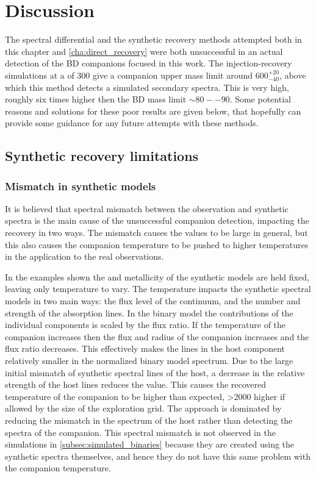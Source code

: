 
\section{Discussion}
\label{sec:chisquared_discussion}
The spectral differential and the synthetic recovery methods attempted both in this chapter and \cref{cha:direct_recovery} were both unsuccessful in an actual detection of the {BD} companions focused in this work.
The injection-recovery simulations at a \snr{} of 300 give a companion upper mass limit around \(600^{+20}_{-40}\), above which this method detects a simulated secondary spectra.
This is very high, roughly six times higher then the {BD} mass limit \(\sim80--90\)\Mjup{}.
Some potential reasons and solutions for these poor results are given below, that hopefully can provide some guidance for any future attempts with these methods.

\subsection{Synthetic recovery limitations}
\label{subsec:limitations}

\subsubsection{Mismatch in synthetic models}
\label{subsubsec:mismatch}
It is believed that spectral mismatch between the observation and synthetic spectra is the main cause of the unsuccessful companion detection, impacting the recovery in two ways.
The mismatch causes the \textchisquared{} values to be large in general, but this also causes the companion temperature to be pushed to higher temperatures in the application to the real observations.

In the examples shown the \Logg{} and metallicity of the synthetic models are held fixed, leaving only temperature to vary.
The temperature impacts the synthetic spectral models in two main ways: the flux level of the continuum, and the number and strength of the absorption lines.
In the binary model the contributions of the individual components is scaled by the flux ratio.
If the temperature of the companion increases then the flux and radius of the companion increases and the flux ratio \FoneFtwo{} decreases.
This effectively makes the lines in the host component relatively smaller in the normalized binary model spectrum.
Due to the large initial mismatch of synthetic spectral lines of the host, a decrease in the relative strength of the host lines reduces the \textchisquared{} value.
This causes the recovered temperature of the companion to be higher than expected, >2000\K{} higher if allowed by the size of the exploration grid.
The \textchisquared{} approach is dominated by reducing the mismatch in the spectrum of the host rather than detecting the spectra of the companion.
This spectral mismatch is not observed in the simulations in \cref{subsec:simulated_binaries} because they are created using the synthetic spectra themselves, and hence they do not have this same problem with the companion temperature.

